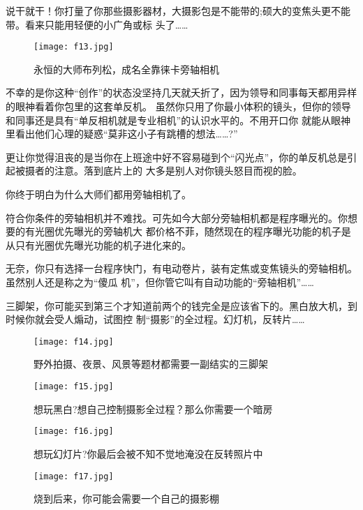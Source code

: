 ﻿\documentclass[12pt,a4paper,onecolumn]{article}
\begin{document}
说干就干！你打量了你那些摄影器材，大摄影包是不能带的;硕大的变焦头更不能带。看来只能用轻便的小广角或标
头了……

\begin{wrapfigure}{r}{0.3\textwidth}
\vspace{-2ex}
\texttt{[image: f13.jpg]}
\caption{永恒的大师布列松，成名全靠徕卡旁轴相机}
\vspace{-2ex}
\end{wrapfigure}

不幸的是你这种“创作”的状态没坚持几天就夭折了，因为领导和同事每天都用异样的眼神看着你包里的这套单反机。
虽然你只用了你最小体积的镜头，但你的领导和同事还是具有“单反相机就是专业相机”的认识水平的。不用开口你
就能从眼神里看出他们心理的疑惑“莫非这小子有跳槽的想法……?”


更让你觉得沮丧的是当你在上班途中好不容易碰到个“闪光点”，你的单反机总是引起被摄者的注意。落到底片上的
大多是别人对你镜头怒目而视的脸。

你终于明白为什么大师们都用旁轴相机了。



符合你条件的旁轴相机并不难找。可先如今大部分旁轴相机都是程序曝光的。你想要的有光圈优先曝光的旁轴机大
都价格不菲，随然现在的程序曝光功能的机子是从只有光圈优先曝光功能的机子进化来的。

无奈，你只有选择一台程序快门，有电动卷片，装有定焦或变焦镜头的旁轴相机。虽然别人还是称之为“傻瓜
机”，但你管它叫有自动功能的“旁轴相机”……

三脚架，你可能买到第三个才知道前两个的钱完全是应该省下的。黑白放大机，到时候你就会受人煽动，试图控
制“摄影”的全过程。幻灯机，反转片……

\begin{figure}
\vspace{-2ex}
\begin{minipage}[t]{0.5\linewidth}
\centering
\texttt{[image: f14.jpg]}
\caption{野外拍摄、夜景、风景等题材都需要一副结实的三脚架}
\end{minipage}%
\begin{minipage}[t]{0.5\linewidth}
\centering
\texttt{[image: f15.jpg]}
\caption{想玩黑白?想自己控制摄影全过程？那么你需要一个暗房}
\end{minipage}

\begin{minipage}[t]{0.5\linewidth}
\centering
\texttt{[image: f16.jpg]}
\caption{想玩幻灯片?你最后会被不知不觉地淹没在反转照片中}
\end{minipage}%
\begin{minipage}[t]{0.5\linewidth}
\centering
\texttt{[image: f17.jpg]}
\caption{烧到后来，你可能会需要一个自己的摄影棚}
\end{minipage}
\vspace{-2ex}
\end{figure}
\end{document}
